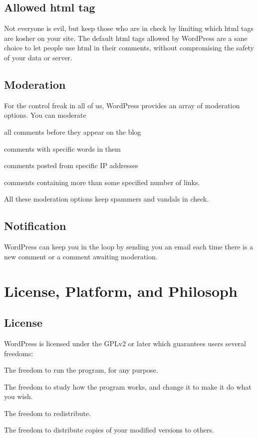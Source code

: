 \subsection{Allowed html tag}

Not everyone is evil, but keep those who are in check by limiting which html tags are kosher on your site. The default html tags allowed by WordPress are a sane choice to let people use html in their comments, without compromising the safety of your data or server.

\subsection{Moderation}

For the control freak in all of us, WordPress provides an array of moderation options. You can moderate
\begin{compactitem}
\item all comments before they appear on the blog
\item comments with specific words in them
\item comments posted from specific IP addresses
\item comments containing more than some specified number of links.
\end{compactitem}

All these moderation options keep spammers and vandals in check.

\subsection{Notification}

WordPress can keep you in the loop by sending you an email each time there is a new comment or a comment awaiting moderation.

\section{License, Platform, and Philosoph}


\subsection{License}

WordPress is licensed under the GPLv2 or later which guarantees users several freedoms:
\begin{compactitem}
\item The freedom to run the program, for any purpose.
\item The freedom to study how the program works, and change it to make it do what you wish.
\item The freedom to redistribute.
\item The freedom to distribute copies of your modified versions to others.
\end{compactitem}

